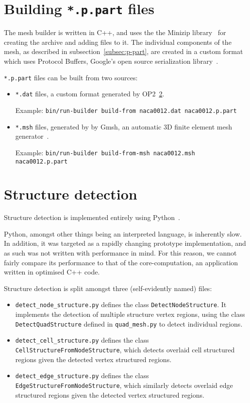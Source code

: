 \section{Building \texttt{*.p.part} files}
The mesh builder is written in C++, and uses the the Minizip library~\cite{minizip} for creating the archive and adding files to it. The individual components of the mesh, as described in subsection~\ref{subsec:p-part}, are created in a custom format which uses Protocol Buffers, Google's open source serialization library~\cite{protocolbuffers}.

\texttt{*.p.part} files can be built from two sources:
\begin{itemize}
\item \texttt{*.dat} files, a custom format generated by OP2~\ref{}.

Example: \texttt{bin/run-builder build-from naca0012.dat naca0012.p.part}
\item \texttt{*.msh} files, generated by by Gmsh, an automatic 3D finite element mesh generator~\cite{geuzaine2008gmsh}.

Example: \texttt{bin/run-builder build-from-msh naca0012.msh naca0012.p.part}
\end{itemize}


\section{Structure detection}
Structure detection is implemented entirely using Python~\cite{python}.

Python, amongst other things being an interpreted language, is inherently slow. In addition, it was targeted as a rapidly changing prototype implementation, and as such was not written with performance in mind. For this reason, we cannot fairly compare its performance to that of the core-computation, an application written in optimised C++ code.

Structure detection is split amongst three (self-evidently named) files:
\begin{itemize}
\item \texttt{detect\_node\_structure.py} defines the class \lstinline|DetectNodeStructure|. It implements the detection of multiple structure vertex regions, using the class \lstinline|DetectQuadStructure| defined in \texttt{quad\_mesh.py} to detect individual regions.
\item \texttt{detect\_cell\_structure.py} defines the class \lstinline|CellStructureFromNodeStructure|, which detects overlaid cell structured regions given the detected vertex structured regions.
\item \texttt{detect\_edge\_structure.py} defines the class \lstinline|EdgeStructureFromNodeStructure|, which similarly detects overlaid edge structured regions given the detected vertex structured regions.
\end{itemize}

